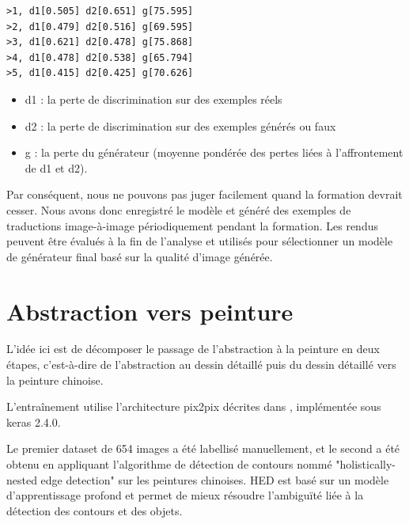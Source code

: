 \documentclass[a4paper, 12pt]{report}
\begin{document}
\vspace*{\baselineskip}

\begin{lstlisting}
>1, d1[0.505] d2[0.651] g[75.595]
>2, d1[0.479] d2[0.516] g[69.595]
>3, d1[0.621] d2[0.478] g[75.868]
>4, d1[0.478] d2[0.538] g[65.794]
>5, d1[0.415] d2[0.425] g[70.626]
\end{lstlisting}

\vspace*{\baselineskip}

\begin{itemize}
\item d1 : la perte de discrimination sur des exemples réels
\item d2 : la perte de discrimination sur des exemples générés ou faux
\item g : la perte du générateur (moyenne pondérée des pertes liées à l’affrontement de d1 et d2).
\end{itemize}

\vspace*{\baselineskip}

Par conséquent, nous ne pouvons pas juger facilement quand la formation devrait cesser. Nous avons donc enregistré le modèle et généré des exemples de traductions image-à-image périodiquement pendant la formation. Les rendus peuvent être évalués à la fin de l’analyse et utilisés pour sélectionner un modèle de générateur final basé sur la qualité d’image générée. 



\pagebreak



\section{Abstraction vers peinture}

L'idée ici est de décomposer le passage de l'abstraction à la peinture en deux étapes, c'est-à-dire de l'abstraction au dessin détaillé puis du dessin détaillé vers la peinture chinoise.

L'entraînement utilise l'architecture pix2pix décrites dans \cite{DBLP:journals/corr/GatysEB15a}, implémentée sous keras 2.4.0.

Le premier dataset de 654 images a été labellisé manuellement, et le second a été obtenu en appliquant l'algorithme de détection de contours nommé "holistically-nested edge detection" \cite{xie2015holisticallynested} sur les peintures chinoises. HED est basé sur un modèle d'apprentissage profond et permet de mieux résoudre l’ambiguïté liée à la détection des contours et des objets. 
\end{document}
